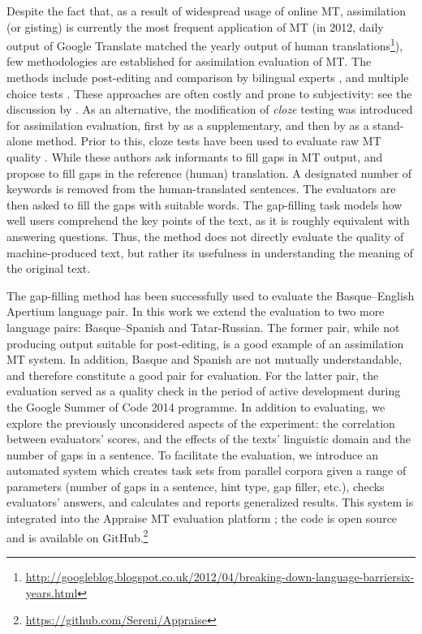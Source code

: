 \documentclass[11pt]{article}
\newcommand{\comment}[1]{}
\begin{document}
Despite the fact that, as a result of widespread usage of online MT, assimilation (or gisting) is currently the most frequent application of MT (in 2012, daily output of Google Translate matched the yearly output of human translations\footnote{\url{http://googleblog.blogspot.co.uk/2012/04/breaking-down-language-barriersix-years.html}}), few methodologies are established for assimilation evaluation of MT. The methods include post-editing and comparison by bilingual experts \citep{ginesti09},\comment{MLF: should we also cite the original WMT reference cited by Ginestí et al.?} and multiple choice tests \citep{jones07,trosterud12}. These approaches are often costly and prone to subjectivity: see the discussion by \cite{oregan13}. As an alternative, the modification of \emph{cloze}\comment{\emph{cloze} stands for \emph{closure}.} testing \citep{taylor53} was introduced for assimilation evaluation, first by \citet{trosterud12} as a supplementary, and then by \citet{oregan13} as a stand-alone method. Prior to this, cloze tests have been used to evaluate raw MT quality \citep{vanslype79,somers00}. While these authors ask informants to fill gaps in MT output, \citet{trosterud12} and \citet{oregan13} propose to fill gaps in the reference (human) translation. A designated number of keywords is removed from the human-translated sentences. The evaluators are then asked to fill the gaps with suitable words. The gap-filling task models how well users comprehend the key points of the text, as it is roughly equivalent with answering questions. Thus, the method does not directly evaluate the quality of machine-produced text, but rather its usefulness in understanding the meaning of the original text. 

The gap-filling method has been successfully used to evaluate the Basque--English Apertium language pair. In this work we extend the evaluation to two more language pairs: Basque--Spanish and Tatar-Russian. The former pair, while not producing output suitable for post-editing, is a good example of an assimilation MT system. In addition, Basque and Spanish are not mutually understandable, and therefore constitute a good pair for evaluation. For the latter pair, the evaluation served as a quality check in the period of active development during the Google Summer of Code 2014 programme. In addition to evaluating, we explore the previously unconsidered aspects of the experiment: the correlation between evaluators' scores, and the effects of the texts' linguistic domain and the number of gaps in a sentence. To facilitate the evaluation, we introduce an automated system which creates task sets from parallel corpora given a range of parameters (number of gaps in a sentence, hint type, gap filler,\comment{MLF: gap filler or gap marker?} \comment{EA: well, initially we had questions with lemmas in place of gaps, and also multiple choice questions where answer options got generated automatically. This is not used in this evaluation, but it's still in the toolkit. Should I remove?} etc.), checks evaluators' answers, and calculates and reports generalized results. This system is integrated into the Appraise MT evaluation platform \citep{federmann12}; the code is open source and is available on GitHub.\footnote{{\url{https://github.com/Sereni/Appraise}}}
\end{document}
